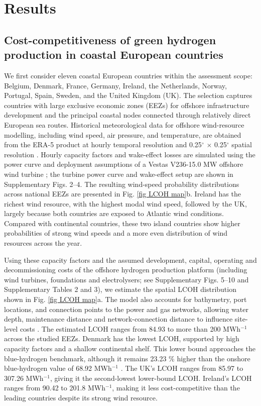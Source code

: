 \documentclass[pdflatex,lineno,sn-mathphys,Numbered]{sn-jnl}%
\begin{document}
\section{Results}

\subsection{Cost-competitiveness of green hydrogen production in coastal European countries}

We first consider eleven coastal European countries within the assessment scope: Belgium, Denmark, France, Germany, Ireland, the Netherlands, Norway, Portugal, Spain, Sweden, and the United Kingdom (UK). The selection captures countries with large exclusive economic zones (EEZs) for offshore infrastructure development and the principal coastal nodes connected through relatively direct European sea routes. Historical meteorological data for offshore wind-resource modelling, including wind speed, air pressure, and temperature, are obtained from the ERA-5 product at hourly temporal resolution and 0.25$^\circ$ $\times$ 0.25$^\circ$ spatial resolution \cite{ERA5}. Hourly capacity factors and wake-effect losses are simulated using the power curve and deployment assumptions of a Vestas V236-15.0 MW offshore wind turbine \cite{V23615}; the turbine power curve and wake-effect setup are shown in Supplementary Figs. 2--4. The resulting wind-speed probability distributions across national EEZs are presented in Fig. \ref{fig LCOH map}b. Ireland has the richest wind resource, with the highest modal wind speed, followed by the UK, largely because both countries are exposed to Atlantic wind conditions. Compared with continental countries, these two island countries show higher probabilities of strong wind speeds and a more even distribution of wind resources across the year.

Using these capacity factors and the assumed development, capital, operating and decommissioning costs of the offshore hydrogen production platform (including wind turbines, foundations and electrolysers; see Supplementary Figs. 5--10 and Supplementary Tables 2 and 3), we estimate the spatial LCOH distribution shown in Fig. \ref{fig LCOH map}a. The model also accounts for bathymetry, port locations, and connection points to the power and gas networks, allowing water depth, maintenance distance and network-connection distance to influence site-level costs \cite{bathymetry_2022, EMODnet}. The estimated LCOH ranges from 84.93 to more than 200 \texteuro{} MWh$^{-1}$ across the studied EEZs. Denmark has the lowest LCOH, supported by high capacity factors and a shallow continental shelf. This lower bound approaches the blue-hydrogen benchmark, although it remains 23.23 \% higher than the onshore blue-hydrogen value of 68.92 \texteuro{} MWh$^{-1}$ \cite{Globalaveragelevelised}. The UK's LCOH ranges from 85.97 to 307.26 \texteuro{} MWh$^{-1}$, giving it the second-lowest lower-bound LCOH. Ireland's LCOH ranges from 90.42 to 201.8 \texteuro{} MWh$^{-1}$, making it less cost-competitive than the leading countries despite its strong wind resource.
\end{document}
